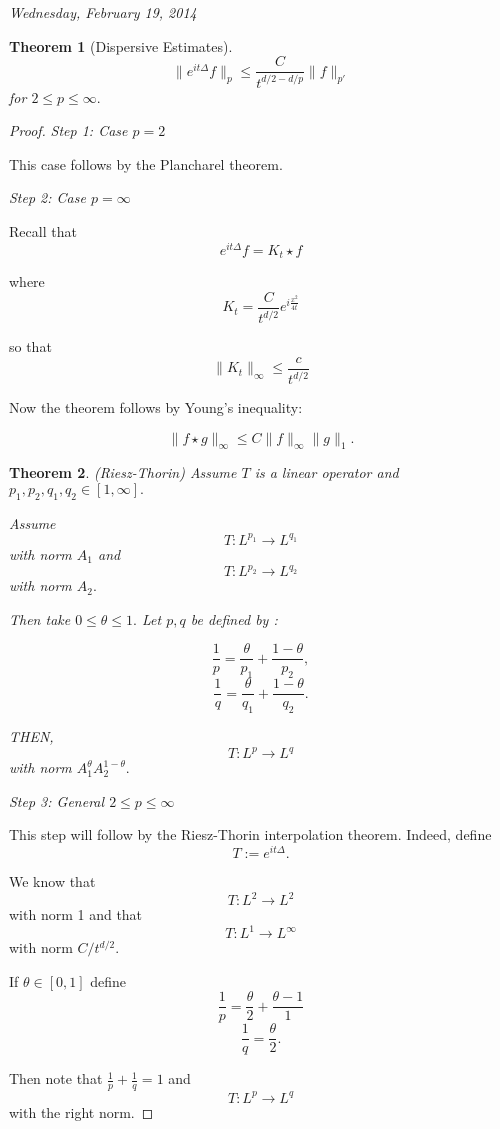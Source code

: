 \documentclass[11pt]{amsart}
\theoremstyle{plain}
\numberwithin{equation}{section}
\newtheorem{thm}{Theorem}[section]
\theoremstyle{remark}
\begin{document}
\emph{Wednesday, February 19, 2014}

\begin{thm} [Dispersive Estimates]

$$\| e^{it\Delta}f \|_{p} \leq \frac{C}{t^{d/2-d/p}} \| f\|_{p'}$$
for $2\leq p\leq \infty.$
\end{thm}

\begin{proof}

\emph{Step 1: Case $p=2$}

This case follows by the Plancharel theorem. 

\emph{Step 2: Case $p=\infty$}

Recall that $$e^{it\Delta} f =K_{t} \star f   $$

where $$K_{t}= \frac{C}{t^{d/2}}e^{i\frac{x^2}{4t}}$$

so that $$\|K_{t}\|_{\infty} \leq \frac{c}{t^{d/2}}$$

Now the theorem follows by Young's inequality:

$$\|f\star g \|_\infty \leq C \|f\|_{\infty} \|g\|_{1}.$$


\begin{thm} (Riesz-Thorin)
Assume $T$ is a linear operator and $p_1,p_2,q_1,q_2 \in [1,\infty].$

Assume $$T: L^{p_1} \rightarrow L^{q_1}$$ with norm $A_1$ 
and $$T: L^{p_2} \rightarrow L^{q_2}$$ with norm $A_2.$

Then take $0\leq \theta \leq 1.$ Let $p,q$ be defined by :

$$\frac{1}{p} = \frac{\theta}{p_1} + \frac{1-\theta}{p_2},$$
$$\frac{1}{q} = \frac{\theta}{q_1} + \frac{1-\theta}{q_2}.$$

THEN, $$T:L^p \rightarrow L^q$$ with norm $A_{1}^\theta A_2 ^{1-\theta}.$
\end{thm}


\emph{Step 3: General $2\leq p\leq \infty$}

This step will follow by the Riesz-Thorin interpolation theorem. Indeed, define $$T:= e^{it\Delta}.$$

We know that $$T:L^2\rightarrow L^2$$ with norm 1 and that $$T:L^1 \rightarrow L^\infty$$ with norm $C/t^{d/2}.$


If $\theta \in [0,1]$ define $$\frac{1}{p} =\frac{\theta}{2}+\frac{\theta-1}{1} $$ $$\frac{1}{q} =\frac{\theta}{2}.$$

Then note that $\frac{1}{p}+\frac{1}{q}=1$ and $$T:L^p\rightarrow L^q$$ with the right norm. 

\end{proof}
\end{document}
